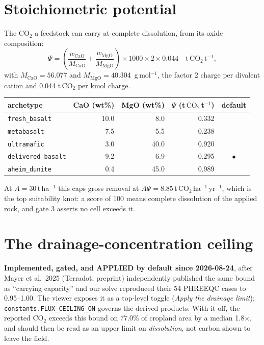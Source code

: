 \documentclass[11pt,a4paper]{article}
\newcommand{\cotwo}{\ensuremath{\mathrm{CO_2}}}
\begin{document}
\section{Stoichiometric potential}
\label{sec:stoich}

The \cotwo{} a feedstock can carry at complete dissolution, from its oxide
composition:
\begin{equation}
\Psi = \left(\frac{w_{\mathrm{CaO}}}{M_{\mathrm{CaO}}}
           + \frac{w_{\mathrm{MgO}}}{M_{\mathrm{MgO}}}\right)
       \times 1000 \times 2 \times 0.044
\quad \mathrm{t\,\cotwo{}\,t^{-1}},
\end{equation}
with $M_{\mathrm{CaO}} = 56.077$ and $M_{\mathrm{MgO}} = 40.304$\,
g\,mol$^{-1}$, the factor 2 charge per divalent cation and
0.044 t\,\cotwo{} per kmol charge.

\begin{center}\small
\begin{tabular}{lrrrc}
\toprule
archetype & CaO (wt\%) & MgO (wt\%) & $\Psi$ (t\,\cotwo{}\,t$^{-1}$) & default \\
\midrule
\texttt{fresh\_basalt} & 10.0 & 8.0 & 0.332 & \\
\texttt{metabasalt} & 7.5 & 5.5 & 0.238 & \\
\texttt{ultramafic} & 3.0 & 40.0 & 0.920 & \\
\texttt{delivered\_basalt} & 9.2 & 6.9 & 0.295 & $\bullet$ \\
\texttt{aheim\_dunite} & 0.4 & 45.0 & 0.989 & \\
\bottomrule
\end{tabular}
\end{center}

At $A = 30$\,t\,ha$^{-1}$ this caps gross removal at
$A\Psi = 8.85$\,t\,\cotwo{}\,ha$^{-1}$\,yr$^{-1}$, which is the top
suitability knot: a score of 100 means complete dissolution of the applied rock,
and gate 3 asserts no cell exceeds it.

\section{The drainage-concentration ceiling}
\label{sec:ceiling}

\begin{tcolorbox}[colback=Gold!12,colframe=DarkGoldenrod,boxrule=0.5pt,arc=2pt]
\small\textbf{Implemented, gated, and APPLIED by default since 2026-08-24}, after
Mayer et al.\ 2025 (Terradot; preprint) independently published the same bound
as ``carrying capacity'' and our solve reproduced their 54 PHREEQC cases to
0.95--1.00. The viewer exposes it as a top-level toggle (\emph{Apply the drainage
limit}); \texttt{constants.FLUX\_CEILING\_ON} governs the derived products. With it
off, the reported \cotwo{} exceeds this bound on 77.0\% of cropland
area by a median 1.8$\times$, and should then be read as an upper limit on
\emph{dissolution}, not carbon shown to leave the field.
\end{tcolorbox}
\end{document}

